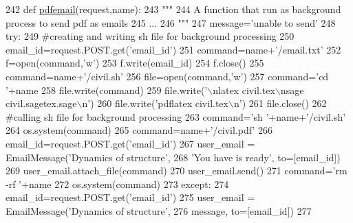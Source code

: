 \begin{DoxyCode}
242 \textcolor{keyword}{def }\hyperlink{namespacecivilsage_1_1views_a9914ff19f8e15ccab1a07eaeac8cfb21}{pdfemail}(request,name):
243     \textcolor{stringliteral}{"""}
244 \textcolor{stringliteral}{    A function that run as background process to send pdf as emails}
245 \textcolor{stringliteral}{    ...}
246 \textcolor{stringliteral}{    """}
247     message=\textcolor{stringliteral}{'unable to send'}
248     \textcolor{keywordflow}{try}:
249         \textcolor{comment}{#creating and writing sh file for background processing}
250         email\_id=request.POST.get(\textcolor{stringliteral}{'email\_id'})
251         command=name+\textcolor{stringliteral}{'/email.txt'}
252         f=open(command,\textcolor{stringliteral}{'w'})
253         f.write(email\_id)
254         f.close()
255         command=name+\textcolor{stringliteral}{'/civil.sh'}
256         file=open(command,\textcolor{stringliteral}{'w'})
257         command=\textcolor{stringliteral}{'cd '}+name
258         file.write(command)
259         file.write(\textcolor{stringliteral}{'\(\backslash\)nlatex civil.tex\(\backslash\)nsage civil.sagetex.sage\(\backslash\)n'})
260         file.write(\textcolor{stringliteral}{'pdflatex civil.tex\(\backslash\)n'})
261         file.close()
262         \textcolor{comment}{#calling sh file for background processing}
263         command=\textcolor{stringliteral}{'sh '}+name+\textcolor{stringliteral}{'/civil.sh'}
264         os.system(command)
265         command=name+\textcolor{stringliteral}{'/civil.pdf'}
266         email\_id=request.POST.get(\textcolor{stringliteral}{'email\_id'})
267         user\_email = EmailMessage(\textcolor{stringliteral}{'Dynamics of structure'},
268         \textcolor{stringliteral}{'You have is ready'}, to=[email\_id])
269         user\_email.attach\_file(command)
270         user\_email.send()
271         command=\textcolor{stringliteral}{'rm -rf '}+name
272         os.system(command)
273     \textcolor{keywordflow}{except}:
274         email\_id=request.POST.get(\textcolor{stringliteral}{'email\_id'})
275         user\_email = EmailMessage(\textcolor{stringliteral}{'Dynamics of structure'},
276         message, to=[email\_id])
277 
\end{DoxyCode}
